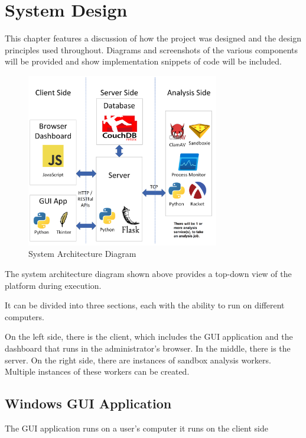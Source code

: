 \chapter{System Design}

This chapter features a discussion of how the project was designed
and the design principles used throughout.
Diagrams and screenshots of the various components will be provided
and show implementation snippets of code will be included.

\begin{figure}[h!]
    \centering
    \includegraphics[width=0.75\textwidth]{images/diagrams/architecture}
    \caption{System Architecture Diagram}
    \label{image:sysArchitecture}
\end{figure}

The system architecture diagram shown above provides
a top-down view of the platform during execution.

It can be divided into three sections,
each with the ability to run on different computers.

On the left side, there is the client,
which includes the GUI application and the dashboard
that runs in the administrator's browser.
In the middle, there is the server. On the right side,
there are instances of sandbox analysis workers.
Multiple instances of these workers can be created.

\section{Windows GUI Application}
The GUI application runs on a user's computer it runs on the client side

